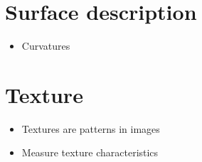 \documentclass[letterpaper,10pt,english]{sphinxmanual}
\begin{document}
\section{Surface description}
\label{\detokenize{06-AdvancedShapeAndTexture:surface-description}}\begin{itemize}
\item {} 
\sphinxAtStartPar
Curvatures

\end{itemize}


\section{Texture}
\label{\detokenize{06-AdvancedShapeAndTexture:texture}}\begin{itemize}
\item {} 
\sphinxAtStartPar
Textures are patterns in images

\item {} 
\sphinxAtStartPar
Measure texture characteristics

\end{itemize}







\renewcommand{\indexname}{Index}
\printindex
\end{document}
